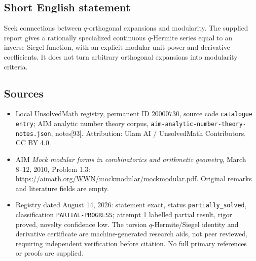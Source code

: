 \documentclass[11pt]{article}
\begin{document}
\subsection{Short English statement}
Seek connections between \(q\)-orthogonal expansions and modularity. The supplied report gives a rationally specialized continuous \(q\)-Hermite series equal to an inverse Siegel function, with an explicit modular-unit power and derivative coefficients. It does not turn arbitrary orthogonal expansions into modularity criteria.
\subsection{Sources}
\begin{itemize}
\item Local UnsolvedMath registry, permanent ID \(20000730\), source code \texttt{catalogue entry}; AIM analytic number theory corpus, \texttt{aim-analytic-number-theory-notes.json}, notes[93]. Attribution: Ulam AI / UnsolvedMath Contributors, CC BY 4.0.
\item AIM \emph{Mock modular forms in combinatorics and arithmetic geometry}, March 8--12, 2010, Problem 1.3: \url{https://aimath.org/WWN/mockmodular/mockmodular.pdf}. Original remarks and literature fields are empty.
\item Registry dated August 14, 2026: statement exact, status \texttt{partially\_solved}, classification \texttt{PARTIAL-PROGRESS}; attempt 1 labelled partial result, rigor proved, novelty confidence low. The torsion \(q\)-Hermite/Siegel identity and derivative certificate are machine-generated research aids, not peer reviewed, requiring independent verification before citation. No full primary references or proofs are supplied.
\end{itemize}
\end{document}
